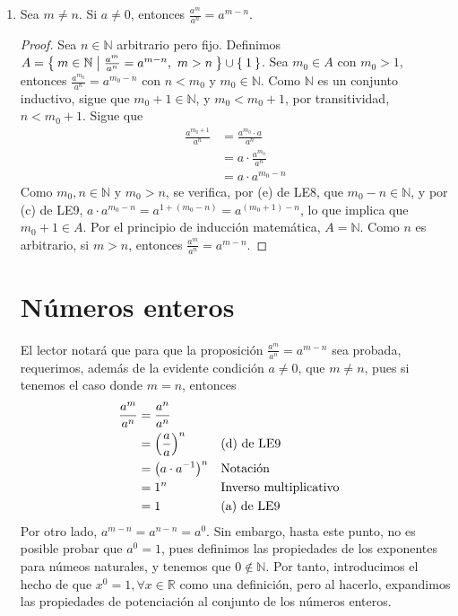 \documentclass[11pt]{article}
\newcommand{\N}{\mathbb{N}}
\newcommand{\R}{\mathbb{R}}
\let\set\Set
\let\union\cup
\begin{document}
\begin{enumerate}[label=\alph*)]
 \item Sea $m\neq n$. Si $a\neq 0$, entonces $\frac{a^m}{a^n} = a^{m-n}$.
 
 \begin{proof}
   Sea $n\in \N$ arbitrario pero fijo. Definimos $A=\set{m \in \N|\frac{a^m}{a^n}=a^{m-n}, \ m>n}\union\set{1}$. 
   Sea $m_0 \in A$ con $m_0>1$, entonces $\frac{a^{m_0}}{a^n} = a^{m_0-n}$ con $n<m_0$ y $m_0\in \N$. Como $\N$ es un conjunto inductivo, sigue que $m_0+1\in \N$, y $m_0<m_0+1$, por transitividad, $n<m_0+1$. Sigue que \begin{align*}
    \frac{a^{m_0+1}}{a^n} &= \frac{a^{m_0}\cdot a}{a^n}\\
    &= a\cdot \frac{a^{m_0}}{a^n}\\
    &= a\cdot a^{m_0-n}
   \end{align*}
   Como $m_0,n \in \N$ y $m_0>n$, se verifica, por (e) de LE8, que $m_0-n\in \N$, y por (c) de LE9, $a\cdot a^{m_0-n} = a^{1+(m_0-n)} = a^{(m_0+1)-n}$, lo que implica que $m_0+1 \in A$. Por el principio de inducción matemática, $A=\N$. Como $n$ es arbitrario, si $m>n$, entonces $\frac{a^m}{a^n} = a^{m-n}$.
 \end{proof}

 \section*{Números enteros}

 El lector notará que para que la proposición $\frac{a^m}{a^n} = a^{m-n}$ sea probada, requerimos, además de la evidente condición $a\neq 0$, que $m\neq n$, pues si tenemos el caso donde $m=n$, entonces \begin{align*}
  \frac{a^m}{a^n} &= \frac{a^n}{a^n}\\
  &= \qty(\frac{a}{a})^n && \text{(d) de LE9}\\
  &= \bigl(a\cdot a^{-1}\bigr)^n && \text{Notación}\\
  &= 1^n && \text{Inverso multiplicativo}\\
  &= 1 && \text{(a) de LE9}
\end{align*}
Por otro lado, $a^{m-n} = a^{n-n} = a^0$. Sin embargo, hasta este punto, no es posible probar que $a^0 = 1$, pues definimos las propiedades de los exponentes para númeos naturales, y tenemos que $0\notin \N$. Por tanto, introducimos el hecho de que $x^0 = 1, \forall x\in \R$ como una definición, pero al hacerlo, expandimos las propiedades de potenciación al conjunto de los números enteros.

 \end{enumerate}
\end{document}

